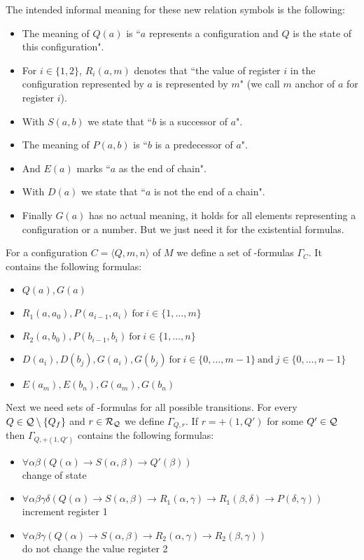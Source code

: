 The intended informal meaning for these new relation symbols is the following:
\begin{itemize}
	\item The meaning of $Q(a)$ is ``$a$ represents a configuration and $Q$ is the state of this configuration".
	\item  For $i\in\{1,2\}$, $R_i(a,m)$ denotes that ``the value of register $i$ in the configuration represented by $a$ is represented by $m$" (we call $m$ anchor of $a$ for register $i$).
	\item With $S(a,b)$ we state that ``$b$ is a successor of $a$".
	\item The meaning of $P(a,b)$ is ``$b$ is a predecessor of $a$".
	\item And $E(a)$ marks ``$a$ as the end of chain".
	\item With $D(a)$ we state that ``$a$ is not the end of a chain".
	\item Finally $G(a)$ has no actual meaning, it holds for all elements representing a configuration or a number. But we just need it for the existential formulas.
\end{itemize}
For a configuration $C=\langle Q,m,n\rangle$ of $M$ we define a set of \SysP-formulas $\Gamma_C$. It contains the following formulas:
\begin{itemize}
	\item $Q(a),G(a)$
	\item $R_1(a,a_0),P(a_{i-1},a_i)~\text{for}~i\in\{1,\dots,m\}$
	\item $R_2(a,b_0),P(b_{i-1},b_i)~\text{for}~i\in\{1,\dots,n\}$
	\item $D(a_i),D(b_j),G(a_i),G(b_j)~\text{for}~i\in\{0,\dots,m-1\}~\text{and}~j\in\{0,\dots,n-1\}$
	\item $E(a_m),E(b_n),G(a_m),G(b_n)$
\end{itemize}
Next we need sets of \SysP-formulas for all possible transitions.
For every $Q\in\mathcal{Q}\setminus\{Q_f\}$ and $r\in\mathcal{R}_{\mathcal{Q}}$ we define $\Gamma_{Q,r}$.
If $r=+(1,Q')$ for some $Q'\in\mathcal{Q}$ then $\Gamma_{Q,+(1,Q')}$ contains the following formulas:
\begin{itemize}
	\item $\forall\alpha\beta(Q(\alpha)\to S(\alpha,\beta)\to Q'(\beta))$ \\change of state
	\item $\forall\alpha\beta\gamma\delta(Q(\alpha)\to S(\alpha,\beta)\to R_1(\alpha,\gamma)\to R_1(\beta,\delta)\to P(\delta,\gamma))$\\increment register 1
	\item $\forall\alpha\beta\gamma(Q(\alpha)\to S(\alpha,\beta)\to R_2(\alpha,\gamma)\to R_2(\beta,\gamma))$ \\do not change the value register 2
\end{itemize}

